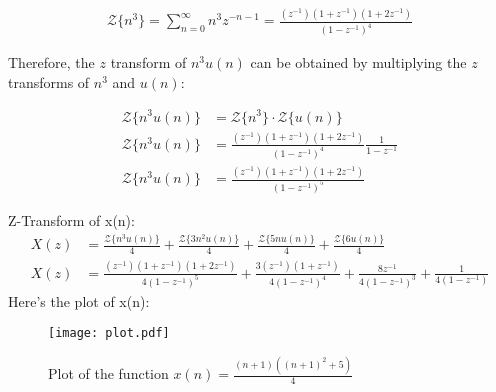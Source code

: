 \documentclass{article}
\begin{document}
\begin{align}
 \mathcal{Z}\{n^3\} = \sum_{n=0}^{\infty} n^3z^{-n-1} = \frac{(z^{-1})(1+z^{-1})(1+2z^{-1})}{(1-z^{-1})^4}
  \end{align}



Therefore, the $z$ transform of $n^3u(n)$ can be obtained by multiplying the $z$ transforms of $n^3$ and $u(n)$:

\begin{align}
\mathcal{Z}\{n^3u(n)\} &= \mathcal{Z}\{n^3\} \cdot \mathcal{Z}\{u(n)\} \\
\mathcal{Z}\{n^3u(n)\}&= \frac{(z^{-1})(1+z^{-1})(1+2z^{-1})}{(1-z^{-1})^4} \frac{1}{1-z^{-1}} \\
\mathcal{Z}\{n^3u(n)\}&= \frac{(z^{-1})(1+z^{-1})(1+2z^{-1})}{(1-z^{-1})^5} 
\end{align}

Z-Transform of x(n):
\begin{align}
X(z) &=  \frac{\mathcal{Z}\{n^3u(n)\}}{4}+ \frac{\mathcal{Z}\{3n^2u(n)\}}{4}+ \frac{\mathcal{Z}\{5nu(n)\}}{4}+ \frac{\mathcal{Z}\{6u(n)\}}{4}\\
X(z)&= \frac{(z^{-1})(1+z^{-1})(1+2z^{-1})}{4(1-z^{-1})^5}+ \frac{3(z^{-1})(1+z^{-1})}{4(1-z^{-1})^4}+\frac{8z^{-1}}{4(1-z^{-1})^3}+\frac{1}{4(1- z^{-1})}
\end{align}
\newpage
Here's the plot of x(n):

\begin{figure}[h]
  \centering
  \texttt{[image: plot.pdf]} %
  \caption{Plot of the function $x(n) = \frac{(n+1)((n+1)^2+5)}{4}$}
  \label{fig:plot}
\end{figure}
\end{document}
